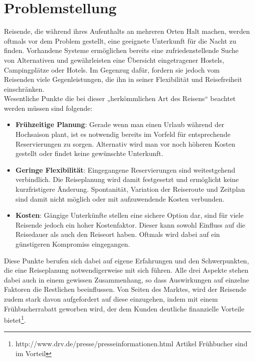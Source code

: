 
\section{Problemstellung}
Reisende, die während ihres Aufenthalts an mehreren Orten Halt machen, werden oftmals vor dem Problem gestellt, eine geeignete Unterkunft für die Nacht zu finden. Vorhandene Systeme ermöglichen bereits eine zufriedenstellende Suche von Alternativen und gewährleisten eine Übersicht eingetragener Hostels, Campingplätze oder Hotels. Im Gegenzug dafür, fordern sie jedoch vom Reisenden viele Gegenleistungen, die ihn in seiner Flexibilität und Reisefreiheit einschränken.\\
Wesentliche Punkte die bei dieser „herkömmlichen Art des Reisens“ beachtet werden müssen sind folgende:
\begin{itemize}
   \item \textbf{Frühzeitige Planung}: Gerade wenn man einen Urlaub während der Hochsaison plant, ist es notwendig bereits im Vorfeld für entsprechende Reservierungen zu sorgen. Alternativ wird man vor noch höheren Kosten gestellt oder findet keine gewünschte Unterkunft. 
   \item \textbf{Geringe Flexibilität}: Eingegangene Reservierungen sind weitestgehend verbindlich. Die Reiseplanung wird damit festgesetzt und ermöglicht keine kurzfristigere Änderung. Spontanität, Variation der Reiseroute und Zeitplan sind damit nicht möglich oder mit aufzuwendende Kosten verbunden. 
   \item \textbf{Kosten}: Gängige Unterkünfte stellen eine sichere Option dar, sind für viele Reisende jedoch ein hoher Kostenfaktor. Dieser kann sowohl Einfluss auf die Reisedauer als auch den Reiseort haben. Oftmals wird dabei auf ein günstigeren Kompromiss eingegangen. 
\end{itemize}

Diese Punkte berufen sich dabei auf eigene Erfahrungen und den Schwerpunkten, die eine Reiseplanung notwendigerweise mit sich führen. Alle drei Aspekte stehen dabei auch in einem gewissen Zusammenhang, so dass  Auswirkungen auf einzelne Faktoren die Restlichen beeinflussen. Von Seiten des Marktes, wird der Reisende zudem stark davon aufgefordert auf diese einzugehen, indem mit einem Frühbucherrabatt geworben wird, der dem Kunden deutliche finanzielle Vorteile bietet\footnote{ http://www.drv.de/presse/presseinformationen.html Artikel Frühbucher sind im Vorteil}.\\    

